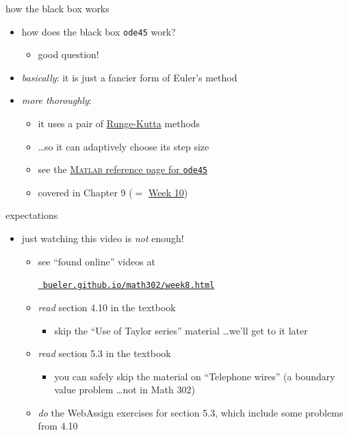 \documentclass[urlcolor=blue,dvipsnames]{beamer}
\newcommand{\Matlab}{\textsc{Matlab}\xspace}
\begin{document}
\begin{frame}{how the black box works}

\begin{itemize}
\item how does the black box \alert{\texttt{ode45}} work?
    \begin{itemize}
    \item good question!
    \end{itemize}
\item \emph{basically}:  it is just a fancier form of Euler's method
\item \emph{more thoroughly}:
    \begin{itemize}
    \item it uses a pair of \href{https://en.wikipedia.org/wiki/Runge_Kutta_methods}{Runge-Kutta} methods
    \item \dots so it can adaptively choose its step size
    \item see the \href{https://www.mathworks.com/help/matlab/ref/ode45.html}{\Matlab reference page for \texttt{ode45}}
    \item covered in Chapter 9 ($=$ \href{https://bueler.github.io/math302/week10.html}{Week 10})
    \end{itemize}
\end{itemize}
\end{frame}


\begin{frame}{expectations}

\begin{itemize}
\item just watching this video is \emph{not} enough!
     \begin{itemize}
     \item see ``found online'' videos at

     \centerline{\href{https://bueler.github.io/math302/week8.html}{\tt \color{cyan} bueler.github.io/math302/week8.html}}
     \item \emph{read} section 4.10 in the textbook
         \begin{itemize}
         \item skip the ``Use of Taylor series'' material \dots we'll get to it later
         \end{itemize}
     \item \emph{read} section 5.3 in the textbook
         \begin{itemize}
         \item you can safely skip the material on ``Telephone wires'' (a boundary value problem \dots not in Math 302)
         \end{itemize}
     \item \emph{do} the WebAssign exercises for section 5.3, which include some problems from 4.10
     \end{itemize}
\end{itemize}
\end{frame}
\end{document}
